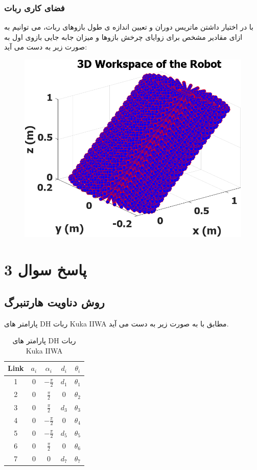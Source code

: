  \subsubsection{فضای کاری ربات}
 
 با در اختیار داشتن ماتریس دوران و تعیین اندازه ی طول بازوهای ربات، می توانیم به ازای مقادیر مشخص برای زوایای چرخش بازوها و میزان جابه جایی بازوی اول به صورت زیر به دست می آید:
 
 
\begin{figure}[H]
	\centering
	\includegraphics[width=0.7\linewidth]{../img/2_Workspace}
	\caption{}
	\label{fig:2workspace}
\end{figure}
 
\section{ پاسخ سوال 3}
\subsection{روش دناویت هارتنبرگ}

پارامتر های DH ربات Kuka IIWA مطابق با 
\cite{slim2023inverse}
به صورت زیر به دست می آید.
\begin{table}[h!]
	\centering
	\renewcommand{\arraystretch}{1.5}
	\begin{tabular}{|c|c|c|c|c|}
		\hline
		Link & \( a_i \) & \( \alpha_i \) & \( d_i \) & \( \theta_i \) \\ \hline
		1 & 0 & \( -\frac{\pi}{2} \) & \( d_1 \) & \( \theta_1 \) \\ \hline
		2 & 0 & \( \frac{\pi}{2} \) & 0 & \( \theta_2 \) \\ \hline
		3 & 0 & \( \frac{\pi}{2} \) & \( d_3 \) & \( \theta_3 \) \\ \hline
		4 & 0 & \( -\frac{\pi}{2} \) & 0 & \( \theta_4 \) \\ \hline
		5 & 0 & \( -\frac{\pi}{2} \) & \( d_5 \) & \( \theta_5 \) \\ \hline
		6 & 0 & \( \frac{\pi}{2} \) & 0 & \( \theta_6 \) \\ \hline
		7 & 0 & 0 & \( d_7 \) & \( \theta_7 \) \\ \hline
	\end{tabular}
	\caption{پارامتر های DH ربات Kuka IIWA}
\end{table}

